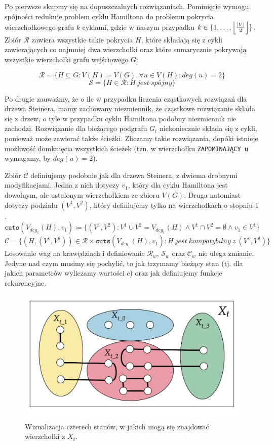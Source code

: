 \documentclass[12pt, oneside]{report}
\DeclarePairedDelimiter\floor{\lfloor}{\rfloor}
\begin{document}
Po pierwsze skupmy się na dopuszczalnych rozwiązaniach. Pominięcie wymogu spójności redukuje problem cyklu Hamiltona do problemu pokrycia wierzchołkowego grafu $k$ cyklami, gdzie w naszym przypadku $k \in \{1, \ldots, \floor*{\frac{|V|}{2}}\}$. Zbiór $\mathcal{R}$ zawiera wszystkie takie pokrycia $H$, które składają się z cykli zawierających co najmniej dwa wierzchołki oraz które sumarycznie pokrywają wszystkie wierzchołki grafu wejściowego $G$:

$$\mathcal{R} = \{H \subseteq G: V(H) = V(G), \forall u \in V(H): deg(u) = 2\}$$
$$\mathcal{S} = \{H \in \mathcal{R}: H\ jest\ sp\mbox{ó}jny\}$$

Po drugie zauważmy, że o ile w przypadku liczenia cząstkowych rozwiązań dla drzewa Steinera, mamy zachowany niezmiennik, że cząstkowe rozwiązanie składa się z drzew, o tyle w przypadku cyklu Hamiltona podobny niezmiennik nie zachodzi. Rozwiązanie dla bieżącego podgrafu $G_t$ niekoniecznie składa się z cykli, ponieważ może zawierać także ścieżki. Zliczamy takie rozwiązania, dopóki istnieje możliwość domknięcia wszystkich ścieżek (tzn. w wierzchołku \texttt{ZAPOMINAJĄCY u} wymagamy, by $deg(u) = 2$).

Zbiór $\mathcal{C}$ definiujemy podobnie jak dla drzewa Steinera, z dwiema drobnymi modyfikacjami. Jedna z nich dotyczy $v_1$, który dla cyklu Hamiltona jest dowolnym, ale ustalonym wierzchołkiem ze zbioru $V(G)$. Druga natomiast dotyczy podziału $(V^1, V^2)$, który definiujemy tylko na wierzchołkach o stopniu $1$.
$$\texttt{cuts} (V_{deg_1}(H), v_1) \coloneqq \{(V^1, V^2): V^1 \cup V^2 = V_{deg_1}(H) \wedge V^1 \cap V^2 = \emptyset \wedge v_1 \in V^1\}$$
$$\mathcal{C} = \{(H, (V^1, V^2)) \in \mathcal{R} \times \texttt{cuts}(V_{deg_1}(H), v_1) : H\ jest\ kompatybilny\ z\ (V^1, V^2)\}$$
\newline
Losowanie wag na krawędziach i definiowanie $\mathcal{R}_w$, $\mathcal{S}_w$ oraz $\mathcal{C}_w$ nie ulega zmianie. Jedyne nad czym musimy się pochylić, to jak trzymamy bieżący stan (tj. dla jakich parametrów wyliczamy wartości $c$) oraz jak definiujemy funkcje rekurencyjne.

\begin{figure}
\centering
\label{cnc_hamiltonian}
\includegraphics[width=16cm]{cnc_hamiltonian2.png}
\caption{Wizualizacja czterech stanów, w jakich mogą się znajdować wierzchołki z $X_t$.}
\end{figure}
\end{document}
